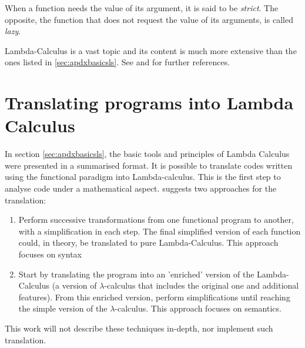 When a function needs the value of its argument, it is said to be \textit{strict}. The opposite, the function that does not request the value of its arguments, is called \textit{lazy}.

Lambda-Calculus is a vast topic and its content is much more extensive than the ones listed in \ref{sec:apdxbasicsls}. See \cite{barendregt2013lambda} and \cite{hindley2008lambda} for further references. 

\section{Translating programs into Lambda Calculus}

In section \ref{sec:apdxbasicsls}, the basic tools and principles of Lambda Calculus were presented in a summarised format. It is possible to translate codes written using the functional paradigm into Lambda-calculus. This is the first step to analyse code under a mathematical aspect. \cite{peyton1987implementation} suggests two approaches for the translation:

\begin{enumerate}
\item Perform successive transformations from one functional program to another, with a simplification in each step. The final simplified version of each function could, in theory, be translated to pure Lambda-Calculus. This approach focuses on syntax
\item Start by translating the program into an 'enriched' version of the Lambda-Calculus (a version of $\lambda$-calculus that includes the original one and additional features). From this enriched version, perform simplifications until reaching the simple version of the $\lambda$-calculus. This approach focuses on semantics.
\end{enumerate}

This work will not describe these techniques in-depth, nor implement such translation.



